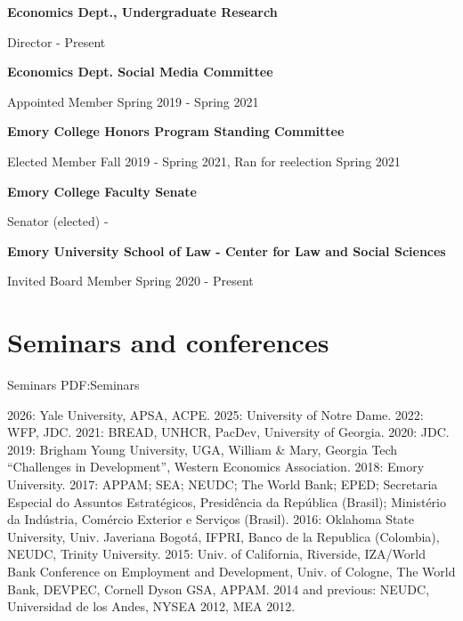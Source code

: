 \documentclass[letterpaper,10pt,oneside]{article}
\begin{document}
\begin{body}
\smallskip

\par
\textbf{Economics Dept., Undergraduate Research}
\par
Director
\hfill
{} - Present

\smallskip

\smallskip
\textbf{Economics Dept. Social Media Committee}
\par
Appointed Member
\hfill
Spring 2019 - Spring 2021

\smallskip

\textbf{Emory College Honors Program Standing Committee}
\par
Elected Member
\hfill
Fall 2019 - Spring 2021, Ran for reelection Spring 2021

\smallskip

\textbf{Emory College Faculty Senate}
\par
Senator (elected)
\hfill
{} - 

\smallskip

\textbf{Emory University School of Law - Center for Law and Social Sciences}
\par
Invited Board Member
\hfill
Spring 2020 - Present



\section
{Seminars and conferences}
{Seminars}
{PDF:Seminars}
\par
2026: Yale University, APSA, ACPE. 2025: University of Notre Dame. 2022: WFP, JDC. 2021: BREAD, UNHCR, PacDev, University of Georgia. 2020: JDC. 2019: Brigham Young University, UGA, William \& Mary, Georgia Tech ``Challenges in Development'', Western Economics Association. 2018: Emory University. 2017: APPAM; SEA; NEUDC; The World Bank; EPED; Secretaria Especial do Assuntos Estrat\'{e}gicos, Presid\^{e}ncia da Rep\'{u}blica (Brasil); Minist\'{e}rio da Ind\'{u}stria, Com\'{e}rcio Exterior e Servi\c{c}os (Brasil). 2016: Oklahoma State University, Univ. Javeriana Bogot\'{a}, IFPRI, Banco de la Republica (Colombia), NEUDC, Trinity University. 2015: Univ. of California, Riverside, IZA/World Bank Conference on Employment and Development, Univ. of Cologne, The World Bank, DEVPEC, Cornell Dyson GSA, APPAM. 2014 and previous: NEUDC, Universidad de los Andes, NYSEA 2012, MEA 2012.


\end{body}
\end{document}
